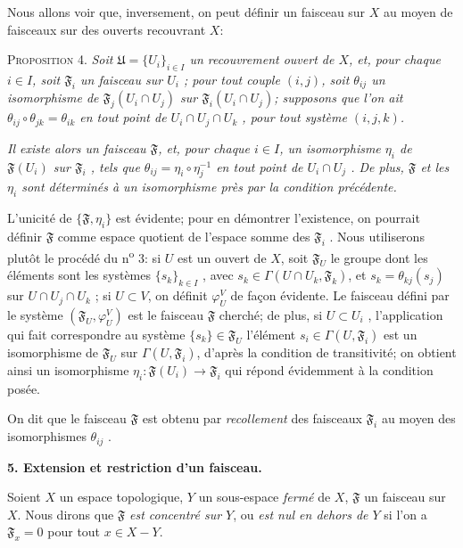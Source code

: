 Nous allons voir que, inversement, on peut définir un faisceau sur $X$ au moyen de faisceaux sur des ouverts recouvrant $X$:

\textsc{Proposition} 4. \textit{Soit $\mathfrak{U} = \{U_i\}_{i \in I}$ un recouvrement ouvert de $X$, et, pour chaque $i \in I$, soit $\mathfrak{F}_i$ un faisceau sur $U_i$ ; pour tout couple $(i, j)$, soit $\theta_{ij}$ un isomorphisme de $\mathfrak{F}_j(U_i \cap U_j)$ sur $\mathfrak{F}_i(U_i \cap U_j)$; supposons que l'on ait $\theta_{ij} \circ \theta_{jk} = \theta_{ik}$ en tout point de $U_i \cap U_j \cap U_k$ , pour tout système $(i, j, k)$.}

\textit{Il existe alors un faisceau $\mathfrak{F}$, et, pour chaque $i \in I$, un isomorphisme $\eta_i$ de $\mathfrak{F}(U_i)$ sur $\mathfrak{F}_i$ , tels que $\theta_{ij} = \eta_i \circ \eta_j^{-1}$ en tout point de $U_i \cap U_j$ . De plus, $\mathfrak{F}$ et les $\eta_i$ sont déterminés à un isomorphisme près par la condition précédente.}

L'unicité de $\{\mathfrak{F}, \eta_i\}$ est évidente; pour en démontrer l'existence, on pourrait
définir $\mathfrak{F}$ comme espace quotient de l'espace somme des $\mathfrak{F}_i$ . Nous utiliserons plutôt le procédé du n\textsuperscript{o} 3: si $U$ est un ouvert de $X$, soit $\mathfrak{F}_U$ le groupe dont les éléments sont les systèmes $\{s_k\}_{k \in I}$ , avec $s_k \in \Gamma(U \cap U_k , \mathfrak{F}_k)$, et $s_k = \theta_{kj}(s_j)$ sur $U \cap U_j \cap U_k$ ; si $U \subset V$, on définit $\varphi^{V}_{U}$ de façon évidente. Le faisceau défini par le système $(\mathfrak{F}_U , \varphi^{V}_{U})$ est le faisceau $\mathfrak{F}$ cherché; de plus, si $U \subset U_i$ , l'application qui fait correspondre au système $\{s_k\} \in \mathfrak{F}_U$ l'élément $s_i \in \Gamma(U , \mathfrak{F}_i)$ est un isomorphisme de $\mathfrak{F}_U$ sur $\Gamma(U, \mathfrak{F}_i)$, d'après la condition de transitivité; on obtient ainsi un isomorphisme $\eta_i : \mathfrak{F}(U_i) \to \mathfrak{F}_i$ qui répond évidemment à la condition posée.

On dit que le faisceau $\mathfrak{F}$ est obtenu par \textit{recollement} des faisceaux $\mathfrak{F}_i$ au moyen des isomorphismes $\theta_{ij}$ .


\textbf{5. Extension et restriction d'un faisceau.}

Soient $X$ un espace topologique, $Y$ un sous-espace \textit{fermé} de $X$, $\mathfrak{F}$ un faisceau sur $X$. Nous dirons que $\mathfrak{F}$ \textit{est concentré sur $Y$}, ou \textit{est nul en dehors de $Y$} si l'on a $\mathfrak{F}_x = 0$ pour tout $x \in X - Y$.

